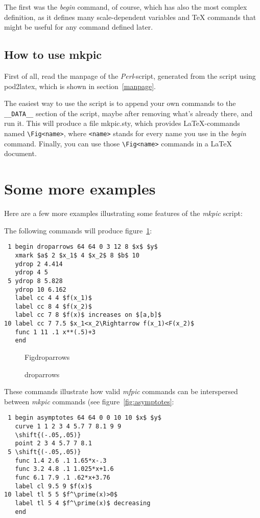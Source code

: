 \documentclass[a4paper,twocolumn]{article}
\def\Mfpic{\textsl{mfpic}}
\def\Mkpic{\textsl{mkpic}}
\def\Perl{\textsl{Perl}}
\newcommand{\makefigure}[1]{
  \vspace{2ex}
  \begin{figure}[htb]
    \begin{center}
      \mbox{\quad\csname Fig#1\endcsname}
      \caption{#1}
      \label{fig:#1}
    \end{center}
  \end{figure}
}
\begin{document}
The first was the \textsl{begin} command, of course, which has also the
most complex definition, as it defines many scale-dependent variables
and \TeX{} commands that might be useful for any command defined later.

\subsection{How to use mkpic}
First of all, read the manpage of the \Perl-script, generated from the
script using pod2latex, which is shown in section~\ref{manpage}.

The easiest way to use the script is to append your own commands to
the \verb|__DATA__| section of the script, maybe after removing what's
already there, and run it. This will produce a file mkpic.sty, which
provides \LaTeX-commands named \verb|\Fig<name>|, where \verb|<name>|
stands for every name you use in the \textsl{begin} command. Finally,
you can use those \verb|\Fig<name>| commands in a \LaTeX{} document.

\section{Some more examples}
Here are a few more examples illustrating some features of the \Mkpic{} 
script:

The following commands will produce figure~\ref{fig:droparrows}:

\footnotesize
\begin{verbatim}
 1 begin droparrows 64 64 0 3 12 8 $x$ $y$
   xmark $a$ 2 $x_1$ 4 $x_2$ 8 $b$ 10
   ydrop 2 4.414
   ydrop 4 5
 5 ydrop 8 5.828
   ydrop 10 6.162
   label cc 4 4 $f(x_1)$
   label cc 8 4 $f(x_2)$
   label cc 7 8 $f(x)$ increases on $[a,b]$
10 label cc 7 7.5 $x_1<x_2\Rightarrow f(x_1)<F(x_2)$
   func 1 11 .1 x**(.5)+3
   end
\end{verbatim}
\normalsize

\makefigure{droparrows}

These commands illustrate how valid \Mfpic{} commands can be
interspersed between \Mkpic{} commands (see figure~\ref{fig:asymptotes}:

\footnotesize
\begin{verbatim}
 1 begin asymptotes 64 64 0 0 10 10 $x$ $y$
   curve 1 1 2 3 4 5.7 7 8.1 9 9
   \shift{(-.05,.05)}
   point 2 3 4 5.7 7 8.1
 5 \shift{(-.05,.05)}
   func 1.4 2.6 .1 1.65*x-.3
   func 3.2 4.8 .1 1.025*x+1.6
   func 6.1 7.9 .1 .62*x+3.76
   label cl 9.5 9 $f(x)$
10 label tl 5 5 $f^\prime(x)>0$
   label tl 5 4 $f^\prime(x)$ decreasing
   end
\end{verbatim}
\normalsize
\end{document}
